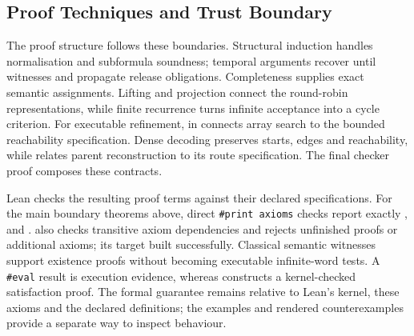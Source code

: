 \subsection{Proof Techniques and Trust Boundary}

The proof structure follows these boundaries.  Structural induction handles
normalisation and subformula soundness; temporal arguments recover until
witnesses and propagate release obligations.  Completeness supplies exact
semantic assignments.  Lifting and projection connect the round-robin
representations, while finite recurrence turns infinite acceptance into a
cycle criterion.  For executable refinement,
 in  connects array
search to the bounded reachability specification.  Dense decoding preserves
starts, edges and reachability, while 
relates parent reconstruction to its route specification.  The final checker
proof composes these contracts.

Lean checks the resulting proof terms against their declared specifications.
For the main boundary theorems above, direct \texttt{\#print axioms} checks report
exactly ,  and .
 also checks transitive axiom
dependencies and rejects unfinished proofs or additional axioms; its target
built successfully.  Classical semantic witnesses support
existence proofs without becoming executable infinite-word tests.  A
\texttt{\#eval} result is execution evidence, whereas 
constructs a kernel-checked satisfaction proof.  The formal guarantee remains
relative to Lean's kernel, these axioms and the declared definitions; the
examples and rendered counterexamples provide a separate way to inspect
behaviour.
\clearpage
